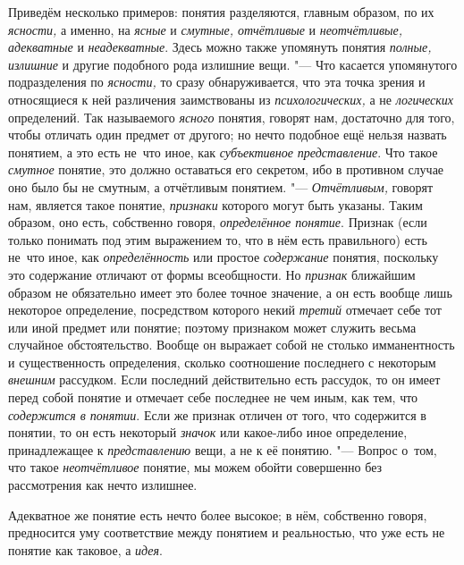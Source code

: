 Приведём несколько примеров: понятия разделяются, главным образом, по их
{\em ясности,} а именно, на {\em ясные} и {\em смутные, отчётливые} и
{\em неотчётливые, адекватные} и {\em неадекватные}. Здесь можно также
упомянуть понятия {\em полные, излишние} и другие подобного рода излишние
вещи. "--- Что касается упомянутого подразделения по {\em ясности,} то сразу
обнаруживается, что эта точка зрения и относящиеся к ней различения
заимствованы из {\em психологических,} а не {\em логических} определений. Так
называемого {\em ясного} понятия, говорят нам, достаточно для того, чтобы
отличать один предмет от другого; но нечто подобное ещё нельзя назвать
понятием, а это есть не~что иное, как {\em субъективное представление}. Что
такое {\em смутное} понятие, это должно оставаться его секретом, ибо в
противном случае оно было бы не смутным, а отчётливым понятием. "---
{\em Отчётливым,} говорят нам, является такое понятие, {\em признаки} которого
могут быть указаны. Таким образом, оно есть, собственно говоря,
{\em определённое понятие}. Признак (если только понимать под этим выражением
то, что в нём есть правильного) есть не~что иное, как {\em определённость} или
простое {\em содержание} понятия, поскольку это содержание отличают от формы
всеобщности. Но {\em признак} ближайшим образом не обязательно имеет это более
точное значение, а он есть вообще лишь некоторое определение, посредством
которого некий {\em третий} отмечает себе тот или иной предмет или понятие;
поэтому признаком может служить весьма случайное обстоятельство. Вообще он
выражает собой не столько имманентность и существенность определения, сколько
соотношение последнего с некоторым {\em внешним} рассудком. Если последний
действительно есть рассудок, то он имеет перед собой понятие и отмечает себе
последнее не чем иным, как тем, что {\em содержится в понятии}. Если же
признак отличен от того, что содержится в понятии, то он
есть некоторый {\em значок} или какое-либо иное определение,
принадлежащее к {\em представлению} вещи, а не к её понятию. "--- Вопрос
о~том, что такое {\em неотчётливое} понятие, мы можем обойти совершенно
без рассмотрения как нечто излишнее.

Адекватное же понятие есть нечто более высокое; в нём,
собственно говоря, предносится уму соответствие между понятием и
реальностью, что уже есть не понятие как таковое, а {\em идея}.

